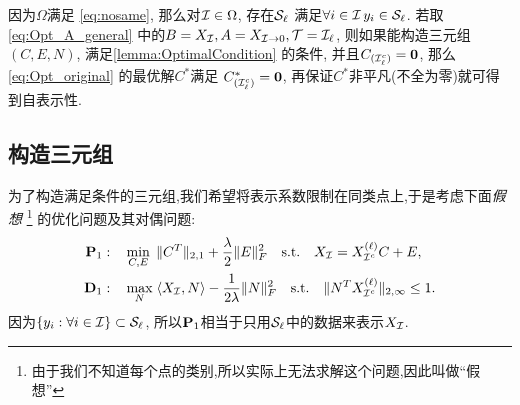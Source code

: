 因为\(\Omega\)满足 \eqref{eq:nosame},    那么对\(\mathcal{I}\in \Omega\),
存在\(\mathcal{S}_\ell\) 满足\( \forall i \in \mathcal{I} \, y_i \in \mathcal{S}_\ell\). 
若取 \eqref{eq:Opt_A_general} 中的\(B=X_{\mathcal{I}}, A=X_{\mathcal{I}\rightarrow 0}, \mathcal{T}=\mathcal{I}_\ell\),
则如果能构造三元组\((C,E,N)\), 满足\autoref{lemma:OptimalCondition} 的条件,
并且\(C_{(\mathcal{I}_\ell^c)}=\mathbf{0}\), 那么 \eqref{eq:Opt_original} 的最优解\(C^*\)满足
\(C^*_{(\mathcal{I}_\ell^c)}=\mathbf{0}\), 再保证\(C^*\)非平凡(不全为零)就可得到自表示性.

\subsection{构造三元组}\label{sec:construct_nu}
为了构造满足条件的三元组,我们希望将表示系数限制在同类点上,于是考虑下面\emph{假想}
\footnote{由于我们不知道每个点的类别,所以实际上无法求解这个问题,因此叫做``假想''}
的优化问题及其对偶问题:
\begin{align}\label{eq:Opt_fictitious2}
  \mathbf{P}_1: \quad &\min_{C, E} \;
  \|C^T\|_{2,1}+\frac{\lambda}{2}\|E\|_F^2 \quad
  \text{s.t.} \quad X_{\mathcal{I}}=X^{(\ell)}_{\mathcal{I}^c}C+E,\\
  \mathbf{D}_1: \quad &\max_{N} \; \langle X_{\mathcal{I}}, N\rangle -
  \frac{1}{2\lambda} \|N\|_F^2 \quad
  \text{s.t.} \quad \|N^T X^{(\ell)}_{\mathcal{I}^c}\|_{2, \infty} \leq 1.
  \label{eq:dual_fictitious2}
\end{align}
因为\(\left\{y_i : \forall i \in \mathcal{I} \right\}\subset \mathcal{S}_\ell\),
所以\(\mathbf{P}_1\)相当于只用\(\mathcal{S}_\ell\)中的数据来表示\(X_{\mathcal{I}}\).

